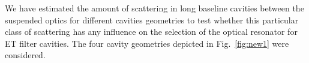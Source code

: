 We have estimated the amount of scattering in long baseline cavities
between the suspended optics for
different cavities geometries to test whether this particular class of scattering
has any influence on the selection of the optical resonator  for ET filter cavities.
The four cavity geometries depicted in Fig.~\ref{fig:new1} were considered.

